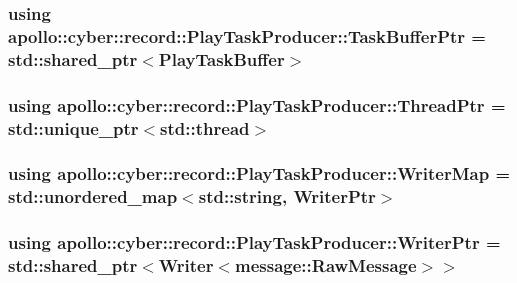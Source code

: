 \hypertarget{classapollo_1_1cyber_1_1record_1_1PlayTaskProducer_a1a4a252c8c244a445f580a9c768c017d}{
\subsubsection[{Task\-Buffer\-Ptr}]{\setlength{\rightskip}{0pt plus 5cm}using {\bf apollo\-::cyber\-::record\-::\-Play\-Task\-Producer\-::\-Task\-Buffer\-Ptr} =  std\-::shared\-\_\-ptr$<${\bf Play\-Task\-Buffer}$>$}}\label{classapollo_1_1cyber_1_1record_1_1PlayTaskProducer_a1a4a252c8c244a445f580a9c768c017d}
\hypertarget{classapollo_1_1cyber_1_1record_1_1PlayTaskProducer_a55cdb4cb1be634a50c15e7c78b6b11ff}{
\subsubsection[{Thread\-Ptr}]{\setlength{\rightskip}{0pt plus 5cm}using {\bf apollo\-::cyber\-::record\-::\-Play\-Task\-Producer\-::\-Thread\-Ptr} =  std\-::unique\-\_\-ptr$<$std\-::thread$>$}}\label{classapollo_1_1cyber_1_1record_1_1PlayTaskProducer_a55cdb4cb1be634a50c15e7c78b6b11ff}
\hypertarget{classapollo_1_1cyber_1_1record_1_1PlayTaskProducer_a044a3f88182daefbe597f7b1bbc49f5d}{
\subsubsection[{Writer\-Map}]{\setlength{\rightskip}{0pt plus 5cm}using {\bf apollo\-::cyber\-::record\-::\-Play\-Task\-Producer\-::\-Writer\-Map} =  std\-::unordered\-\_\-map$<$std\-::string, {\bf Writer\-Ptr}$>$}}\label{classapollo_1_1cyber_1_1record_1_1PlayTaskProducer_a044a3f88182daefbe597f7b1bbc49f5d}
\hypertarget{classapollo_1_1cyber_1_1record_1_1PlayTaskProducer_a6e942a0d93a125434e567f9b1073ce4d}{
\subsubsection[{Writer\-Ptr}]{\setlength{\rightskip}{0pt plus 5cm}using {\bf apollo\-::cyber\-::record\-::\-Play\-Task\-Producer\-::\-Writer\-Ptr} =  std\-::shared\-\_\-ptr$<${\bf Writer}$<${\bf message\-::\-Raw\-Message}$>$$>$}}\label{classapollo_1_1cyber_1_1record_1_1PlayTaskProducer_a6e942a0d93a125434e567f9b1073ce4d}


